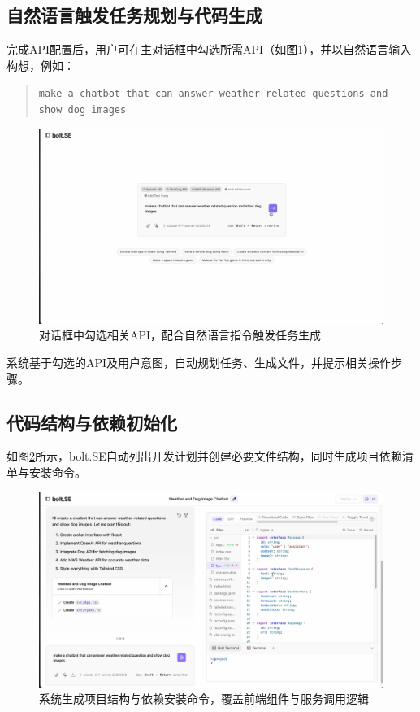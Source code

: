 \subsection{自然语言触发任务规划与代码生成}

完成API配置后，用户可在主对话框中勾选所需API（如图\ref{fig:demo_prompt}），并以自然语言输入构想，例如：

\begin{quote}
\texttt{make a chatbot that can answer weather related questions and show dog images}
\end{quote}

\begin{figure}[htbp]
  \centering
  \includegraphics[width=\textwidth]{figures/screenshots/api-actions/demo_prompt_tags.png}
  \caption{对话框中勾选相关API，配合自然语言指令触发任务生成}
  \label{fig:demo_prompt}
\end{figure}

系统基于勾选的API及用户意图，自动规划任务、生成文件，并提示相关操作步骤。

\subsection{代码结构与依赖初始化}

如图\ref{fig:demo_plan}所示，bolt.SE自动列出开发计划并创建必要文件结构，同时生成项目依赖清单与安装命令。

\begin{figure}[htbp]
  \centering
  \includegraphics[width=\textwidth]{figures/screenshots/api-actions/demo_plan_files.png}
  \caption{系统生成项目结构与依赖安装命令，覆盖前端组件与服务调用逻辑}
  \label{fig:demo_plan}
\end{figure}

